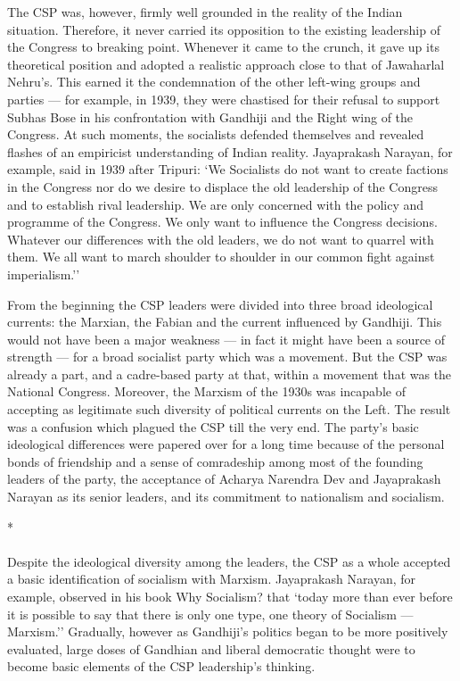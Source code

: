 \begin{multicols}{2}
The CSP was, however, firmly well grounded in the reality of the Indian situation. Therefore, it never carried its opposition to the existing leadership of the Congress to breaking point. Whenever it came to the crunch, it gave up its theoretical position and adopted a realistic approach close to that of Jawaharlal Nehru's. This earned it the condemnation of the other left-wing groups and parties --- for example, in 1939, they were chastised for their refusal to support Subhas Bose in his confrontation with Gandhiji and the Right wing of the Congress. At such moments, the socialists defended themselves and revealed flashes of an empiricist understanding of Indian reality. Jayaprakash Narayan, for example, said in 1939 after Tripuri: `We Socialists do not want to create factions in the Congress nor do we desire to displace the old leadership of the Congress and to establish rival leadership. We are only concerned with the policy and programme of the Congress. We only want to influence the Congress decisions. Whatever our differences with the old leaders, we do not want to quarrel with them. We all want to march shoulder to shoulder in our common fight against imperialism.'' 

From the beginning the CSP leaders were divided into three broad ideological currents: the Marxian, the Fabian and the current influenced by Gandhiji. This would not have been a major weakness --- in fact it might have been a source of strength --- for a broad socialist party which was a movement. But the CSP was already a part, and a cadre-based party at that, within a movement that was the National Congress. Moreover, the Marxism of the 1930s was incapable of accepting as legitimate such diversity of political currents on the Left. The result was a confusion which plagued the CSP till the very end. The party's basic ideological differences were papered over for a long time because of the personal bonds of friendship and a sense of comradeship among most of the founding leaders of the party, the acceptance of Acharya Narendra Dev and Jayaprakash Narayan as its senior leaders, and its commitment to nationalism and socialism.

\begin{center}*\end{center}

\paragraph*{}

Despite the ideological diversity among the leaders, the CSP as a whole accepted a basic identification of socialism with Marxism. Jayaprakash Narayan, for example, observed in his book Why Socialism? that `today more than ever before it is possible to say that there is only one type, one theory of Socialism --- Marxism.'' Gradually, however as Gandhiji's politics began to be more positively evaluated, large doses of Gandhian and liberal democratic thought were to become basic elements of the CSP leadership's thinking. 


\end{multicols}
